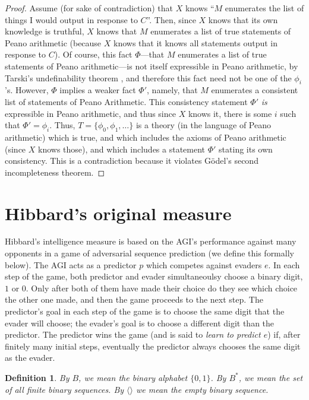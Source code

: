 \documentclass{article}
\newtheorem{definition}[theorem]{Definition}
\begin{document}
\begin{proof}
    Assume (for sake of contradiction) that $X$ knows ``$M$ enumerates the
    list of things I would output in response to $C$''.
    Then, since $X$ knows that its own knowledge is truthful,
    $X$ knows that $M$ enumerates a list of true statements of Peano arithmetic
    (because $X$ knows that it knows all statements output in response to $C$).
    Of course, this fact $\Phi$---that $M$ enumerates a list of true statements of Peano
    arithmetic---is not itself expressible in Peano arithmetic, by Tarski's
    undefinability theorem \cite{tarski1936wahrheitsbegriff},
    and therefore this fact need not be one of the $\phi_i$'s.
    However, $\Phi$ implies a weaker fact $\Phi'$, namely, that $M$ enumerates a consistent
    list of statements of Peano Arithmetic. This consistency statement $\Phi'$ \emph{is}
    expressible in Peano arithmetic, and thus since $X$ knows it,
    there is some $i$ such that $\Phi'=\phi_i$. Thus, $T=\{\phi_0,\phi_1,\ldots\}$
    is a theory (in the language of Peano arithmetic) which is true, and which
    includes the axioms of Peano arithmetic (since $X$ knows those), and which
    includes a statement $\Phi'$ stating its own consistency. This is a contradiction
    because it violates G\"odel's second incompleteness theorem.
\end{proof}

\section{Hibbard's original measure}
\label{originalmeasuresection}

Hibbard's intelligence measure is based on the AGI's performance against
many opponents in a game of adversarial sequence prediction (we define this
formally below). The AGI acts as
a predictor $p$ which competes against evaders $e$. In each step of the game,
both predictor and evader simultaneoulsy choose a binary digit, $1$ or $0$.
Only after both of them have made their choice do they see which choice the other
one made, and then the game proceeds to the next step. The predictor's goal in
each step of the game is to choose the same digit that the evader will choose;
the evader's goal is to choose a different digit than the predictor. The predictor
wins the game (and is said to \emph{learn to predict $e$}) if, after finitely many
initial steps, eventually the predictor always chooses the same digit as the
evader.

\begin{definition}
By $B$, we mean the binary alphabet $\{0,1\}$. By $B^*$, we mean the set of all
finite binary sequences. By $\langle\rangle$ we mean the empty binary sequence.
\end{definition}
\end{document}
